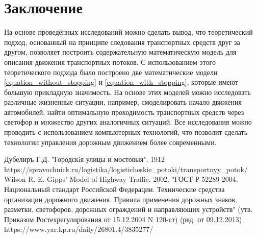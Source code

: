 \documentclass[12pt, a4paper]{extarticle}
\numberwithin{equation}{section}
\begin{document}
\section*{Заключение}
На основе проведённых исследований можно сделать вывод, что теоретический подход, основанный на принципе следования транспортных средств друг за другом, позволяет построить содержательную математическую модель для описания движения транспортных потоков. С использованием этого теоретического подхода было построено две математические модели  \eqref{equation_without_stopping} и \eqref{equation_with_stopping}, которые имеют большую прикладную значимость. На основе этих моделей можно исследовать различные жизненные ситуации, например, смоделировать начало движения автомобилей, найти оптимальную проходимость транспортных средств через светофор и множество других аналогичных ситуаций. Все исследования можно проводить с использованием компьютерных технологий, что позволит сделать технологии управления дорожным движением более современными.

\newpage

\begin{thebibliography}{**}
	Дубелиръ Г.Д. "Городскiя улицы и мостовыя". 1912
	https://spravochnick.ru/logistika/logisticheskie\_potoki/transportnyy\_potok/
	Wilson R. E. Gipps’ Model of Highway Traffic. 2002.
	"ГОСТ Р 52289-2004. Национальный стандарт Российской Федерации. Технические средства организации дорожного движения. Правила применения дорожных знаков, разметки, светофоров, дорожных ограждений и направляющих устройств" (утв. Приказом Ростехрегулирования от 15.12.2004 N 120-ст) (ред. от 09.12.2013)
	https://www.yar.kp.ru/daily/26801.4/3835277/
\end{thebibliography}
\end{document}
